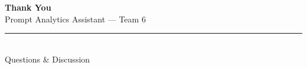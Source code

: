 \documentclass[aspectratio=169]{beamer}
\begin{document}
\begin{frame}
  \begin{center}
    {\Huge \textbf{Thank You}}\\[1em]
    {\large Prompt Analytics Assistant — Team 6}\\[0.5em]
    \textcolor{primary}{\rule{6cm}{0.4pt}}\\[0.5em]
    \small Questions \& Discussion
  \end{center}
\end{frame}
\end{document}
